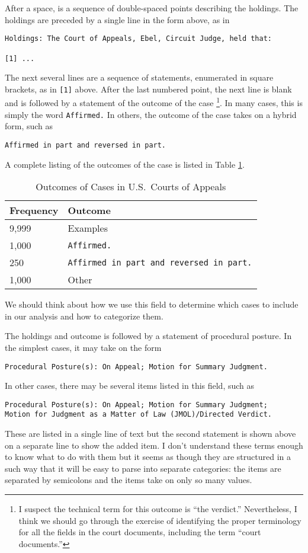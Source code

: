 \documentclass[11pt]{paper}
\begin{document}
After a space, is a sequence of double-spaced points describing the holdings. 
The holdings are preceded by a single line in the form above, as in 
% 
\begin{verbatim}
Holdings: The Court of Appeals, Ebel, Circuit Judge, held that:

[1] ...
\end{verbatim}
% 
The next several lines are a sequence of statements, enumerated in square brackets, as in \texttt{[1]} above. 
After the last numbered point, the next line is blank and is followed by a statement of the outcome of the case%
\footnote{I suspect the technical term for this outcome is ``the verdict.'' 
Nevertheless, I think we should go through the exercise 
of identifying the proper terminology for all the fields in the court documents, including the term ``court documents.''}. 
In many cases, this is simply the word \texttt{Affirmed.}
In others, the outcome of the case takes on a hybrid form, such as
% 
\begin{verbatim}
Affirmed in part and reversed in part.
\end{verbatim}
% 
A complete listing of the outcomes of the case is listed in Table \ref{tab:outcome_list}. 
% 
\begin{table}[ht]
\centering
\begin{tabular}{l l}
  \hline
	Frequency 	& Outcome \\ 
  \hline
  	9,999 		& Examples \\ 
  	1,000 		& \texttt{Affirmed.} \\ 
	   250 		& \texttt{Affirmed in part and reversed in part.} \\ 
  	1,000 		& Other \\ 
   \hline
\end{tabular}
\caption{Outcomes of Cases in U.S.~Courts of Appeals} 
\label{tab:outcome_list}
\end{table}
% 
We should think about how we use this field 
to determine which cases to include in our analysis and how to categorize them. 

The holdings and outcome is followed by a statement of procedural posture. 
In the simplest cases, it may take on the form
\begin{verbatim}
Procedural Posture(s): On Appeal; Motion for Summary Judgment.
\end{verbatim}
% 
In other cases, there may be several items listed in this field, such as
\begin{verbatim}
Procedural Posture(s): On Appeal; Motion for Summary Judgment; 
Motion for Judgment as a Matter of Law (JMOL)/Directed Verdict.
\end{verbatim}
% 
These are listed in a single line of text but
the second statement is shown above on a separate line to show the added item. 
I don't understand these terms enough to know what to do with them
but it seems as though they are structured in a such way that it will be easy to parse 
into separate categories: the items are separated by semicolons 
and the items take on only so many values. 
\end{document}
